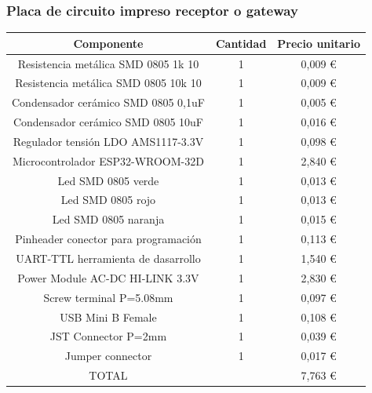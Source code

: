 \documentclass[paper=a4, fontsize=11pt,twoside]{scrartcl}	%
\begin{document}
            \subsubsection{Placa de circuito impreso receptor o gateway}
                \begin{center}
                    \begin{tabular}{||c | c |c ||} 
                    \hline
                    Componente & Cantidad & Precio unitario  \\ [0.5ex] 
                    \hline
                    Resistencia metálica SMD 0805 1k 10  	&1&	 0,009 € \\ 
                    Resistencia metálica SMD 0805 10k 10 	&1&	 0,009 € \\ 
                    Condensador cerámico SMD 0805 0,1uF  	&1&	 0,005 € \\ 
                    Condensador cerámico SMD 0805 10uF   	&1&	 0,016 € \\ 
                    Regulador tensión LDO AMS1117-3.3V   	&1&	 0,098 € \\ 
                    Microcontrolador ESP32-WROOM-32D     	&1&	 2,840 € \\ 
                    Led SMD 0805 verde                   	&1&	 0,013 € \\ 
                    Led SMD 0805 rojo                    	&1&	 0,013 € \\ 
                    Led SMD 0805 naranja                 	&1&	 0,015 € \\ 
                    Pinheader conector para programación 	&1&	 0,113 € \\ 
                    UART-TTL herramienta de dasarrollo   	&1&	 1,540 € \\ 
                    Power Module AC-DC HI-LINK 3.3V	        &1&	 2,830 € \\ 
                    Screw terminal P=5.08mm	                &1&	 0,097 € \\ 
                    USB Mini B Female                    	&1&	 0,108 € \\ 
                    JST Connector P=2mm                  	&1&	 0,039 € \\ 
                    Jumper connector	                    &1&	 0,017 € \\ 
                    \hline
                    TOTAL                    	            &&	 7,763 € \\ 
                    \hline
                    \end{tabular}
                \end{center}
\end{document}
